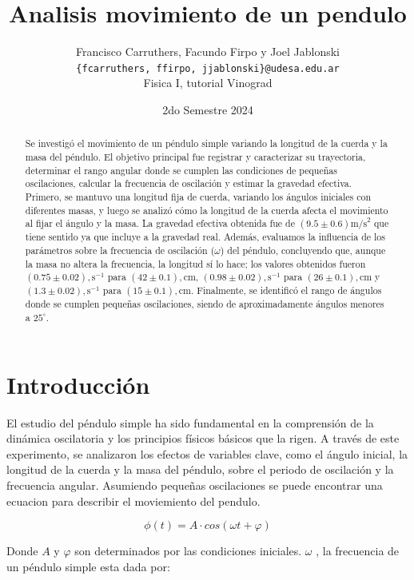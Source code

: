\documentclass[12pt,a4]{article}
\title{Analisis movimiento de un pendulo}
\author{Francisco Carruthers, Facundo Firpo y Joel Jablonski\\ [2mm]
\small \texttt{\{fcarruthers, ffirpo, jjablonski\}@udesa.edu.ar}\\
\small Fisica I, tutorial Vinograd}
\date{2do Semestre 2024}
\begin{document}
\maketitle

\begin{abstract}
    Se investigó el movimiento de un péndulo simple variando la longitud de la cuerda y la masa del péndulo. El objetivo principal fue registrar y caracterizar su trayectoria, determinar el rango angular donde se cumplen las condiciones de pequeñas oscilaciones, calcular la frecuencia de oscilación y estimar la gravedad efectiva. Primero, se mantuvo una longitud fija de cuerda, variando los ángulos iniciales con diferentes masas, y luego se analizó cómo la longitud de la cuerda afecta el movimiento al fijar el ángulo y la masa. La gravedad efectiva obtenida fue de $(9.5 \pm 0.6) \text{m/s}^2$ que tiene sentido ya que incluye a la gravedad real. Además, evaluamos la influencia de los parámetros sobre la frecuencia de oscilación ($\omega$) del péndulo, concluyendo que, aunque la masa no altera la frecuencia, la longitud sí lo hace; los valores obtenidos fueron \((0.75 \pm 0.02), \text{s}^{-1}\) para \((42 \pm 0.1), \text{cm}\), \((0.98 \pm 0.02), \text{s}^{-1}\) para \((26 \pm 0.1), \text{cm}\) y \((1.3 \pm 0.02), \text{s}^{-1}\) para \((15 \pm 0.1), \text{cm}\). Finalmente, se identificó el rango de ángulos donde se cumplen pequeñas oscilaciones, siendo de aproximadamente ángulos menores a $25^\circ$.

\end{abstract}

\section{Introducción}

El estudio del péndulo simple ha sido fundamental en la comprensión de la dinámica oscilatoria y los principios físicos básicos que la rigen. A través de este experimento, se analizaron los efectos de variables clave, como el ángulo inicial, la longitud de la cuerda y la masa del péndulo, sobre el periodo de oscilación y la frecuencia angular. Asumiendo pequeñas oscilaciones se puede encontrar una ecuacion para describir el moviemiento del pendulo.

\begin{equation}
    \phi(t) = A \cdot cos(\omega t + \varphi)
\end{equation}

Donde $A$ y $\varphi$ son determinados por las condiciones iniciales. $\omega$ , la frecuencia de un péndulo simple esta dada por:
\end{document}
